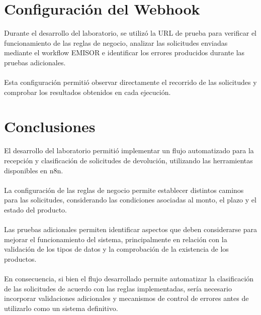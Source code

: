 \documentclass[12pt,a4paper]{article}
\begin{document}
\section{Configuración del Webhook}

\noindent Durante el desarrollo del laboratorio, se utilizó la URL de  prueba para verificar el funcionamiento de las reglas de negocio, analizar las solicitudes enviadas mediante el workflow EMISOR e identificar los errores producidos durante las pruebas adicionales.
\\\\
\noindent Esta configuración permitió observar directamente el recorrido de las solicitudes y comprobar los resultados obtenidos en cada ejecución.

\section{Conclusiones}

\noindent El desarrollo del laboratorio permitió implementar un flujo automatizado para la recepción y clasificación de solicitudes de devolución, utilizando las herramientas disponibles en n8n.
\\\\
\noindent La configuración de las reglas de negocio permite establecer distintos caminos para las solicitudes, considerando las condiciones asociadas al monto, el plazo y el estado del producto.
\\\\
\noindent Las pruebas adicionales permiten identificar aspectos que deben considerarse para mejorar el funcionamiento del sistema, principalmente en relación con la validación de los tipos de datos y la comprobación de la existencia de los productos.
\\\\
\noindent En consecuencia, si bien el flujo desarrollado permite automatizar la clasificación de las solicitudes de acuerdo con las reglas implementadas, sería necesario incorporar validaciones adicionales y mecanismos de control de errores antes de utilizarlo como un sistema definitivo.
\end{document}
